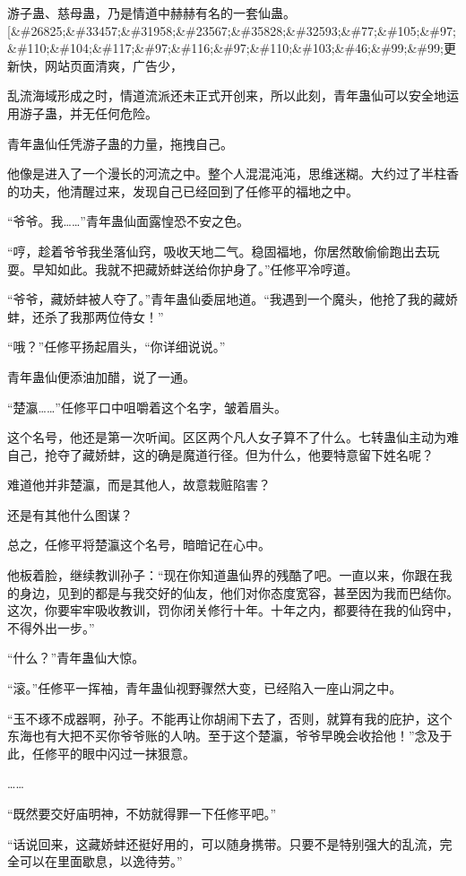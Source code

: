 \begin{this_body}
游子蛊、慈母蛊，乃是情道中赫赫有名的一套仙蛊。[\&\#26825;\&\#33457;\&\#31958;\&\#23567;\&\#35828;\&\#32593;\&\#77;\&\#105;\&\#97;\&\#110;\&\#104;\&\#117;\&\#97;\&\#116;\&\#97;\&\#110;\&\#103;\&\#46;\&\#99;\&\#99;更新快，网站页面清爽，广告少，

乱流海域形成之时，情道流派还未正式开创来，所以此刻，青年蛊仙可以安全地运用游子蛊，并无任何危险。

青年蛊仙任凭游子蛊的力量，拖拽自己。

他像是进入了一个漫长的河流之中。整个人混混沌沌，思维迷糊。大约过了半柱香的功夫，他清醒过来，发现自己已经回到了任修平的福地之中。

“爷爷。我……”青年蛊仙面露惶恐不安之色。

“哼，趁着爷爷我坐落仙窍，吸收天地二气。稳固福地，你居然敢偷偷跑出去玩耍。早知如此。我就不把藏娇蚌送给你护身了。”任修平冷哼道。

“爷爷，藏娇蚌被人夺了。”青年蛊仙委屈地道。“我遇到一个魔头，他抢了我的藏娇蚌，还杀了我那两位侍女！”

“哦？”任修平扬起眉头，“你详细说说。”

青年蛊仙便添油加醋，说了一通。

“楚瀛……”任修平口中咀嚼着这个名字，皱着眉头。

这个名号，他还是第一次听闻。区区两个凡人女子算不了什么。七转蛊仙主动为难自己，抢夺了藏娇蚌，这的确是魔道行径。但为什么，他要特意留下姓名呢？

难道他并非楚瀛，而是其他人，故意栽赃陷害？

还是有其他什么图谋？

总之，任修平将楚瀛这个名号，暗暗记在心中。

他板着脸，继续教训孙子：“现在你知道蛊仙界的残酷了吧。一直以来，你跟在我的身边，见到的都是与我交好的仙友，他们对你态度宽容，甚至因为我而巴结你。这次，你要牢牢吸收教训，罚你闭关修行十年。十年之内，都要待在我的仙窍中，不得外出一步。”

“什么？”青年蛊仙大惊。

“滚。”任修平一挥袖，青年蛊仙视野骤然大变，已经陷入一座山洞之中。

“玉不琢不成器啊，孙子。不能再让你胡闹下去了，否则，就算有我的庇护，这个东海也有大把不买你爷爷账的人呐。至于这个楚瀛，爷爷早晚会收拾他！”念及于此，任修平的眼中闪过一抹狠意。

……

“既然要交好庙明神，不妨就得罪一下任修平吧。”

“话说回来，这藏娇蚌还挺好用的，可以随身携带。只要不是特别强大的乱流，完全可以在里面歇息，以逸待劳。”


\end{this_body}
